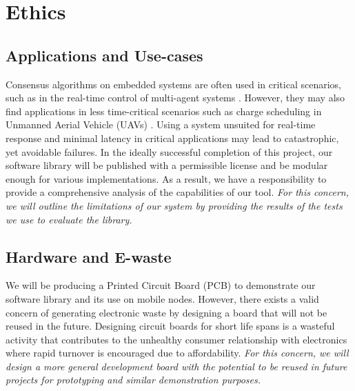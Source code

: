 \section{Ethics}

\subsection{Applications and Use-cases}
Consensus algorithms on embedded systems are often used in critical scenarios, such as in the real-time control of multi-agent systems \cite{ConsensusClassDiscretetime, Olfati_Saber_Fax_Murray_2007}. However, they may also find applications in less time-critical scenarios such as charge scheduling in Unmanned Aerial Vehicle (UAVs) \cite{hassijaSchedulingDroneCharging2020}. Using a system unsuited for real-time response and minimal latency in critical applications may lead to catastrophic, yet avoidable failures. In the ideally successful completion of this project, our software library will be published with a permissible license and be modular enough for various implementations. As a result, we have a responsibility to provide a comprehensive analysis of the capabilities of our tool. \textit{For this concern, we will outline the limitations of our system by providing the results of the tests we use to evaluate the library.}

\subsection{Hardware and E-waste}
We will be producing a Printed Circuit Board (PCB) to demonstrate our software library and its use on mobile nodes. However, there exists a valid concern of generating electronic waste by designing a board that will not be reused in the future. Designing circuit boards for short life spans is a wasteful activity that contributes to the unhealthy consumer relationship with electronics where rapid turnover is encouraged due to affordability. \textit{For this concern, we will design a more general development board with the potential to be reused in future projects for prototyping and similar demonstration purposes.}